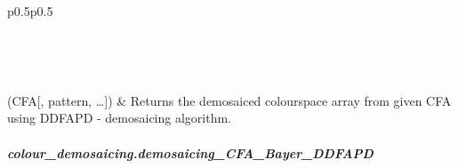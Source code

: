 \documentclass[letterpaper,10pt,english]{sphinxmanual}
\begin{document}
\begin{fulllineitems}
\begin{sphinxVerbatim}[commandchars=\\\{\}]
\PYG{g+go}{       [[ 0.30588236,  0.35686275,  0.3764706 ],}
\PYG{g+go}{        [ 0.29803923,  0.3764706 ,  0.42352942]]])}
\end{sphinxVerbatim}

\end{fulllineitems}





\begin{savenotes}\sphinxatlongtablestart\begin{longtable}{p{0.5\linewidth}p{0.5\linewidth}}
\hline

\endfirsthead

%
{}\\
\hline

\endhead

\hline
{}\\
\endfoot

\endlastfoot

{\hyperref[\detokenize{generated/colour_demosaicing.demosaicing_CFA_Bayer_DDFAPD:colour_demosaicing.demosaicing_CFA_Bayer_DDFAPD}]{}}(CFA{[}, pattern, …{]})
&
Returns the demosaiced  colourspace array from given  CFA using DDFAPD -  demosaicing algorithm.
\\
\hline
\end{longtable}\sphinxatlongtableend\end{savenotes}


\subparagraph{colour\_demosaicing.demosaicing\_CFA\_Bayer\_DDFAPD}
\label{\detokenize{generated/colour_demosaicing.demosaicing_CFA_Bayer_DDFAPD:colour-demosaicing-demosaicing-cfa-bayer-ddfapd}}\label{\detokenize{generated/colour_demosaicing.demosaicing_CFA_Bayer_DDFAPD::doc}}
\end{document}
